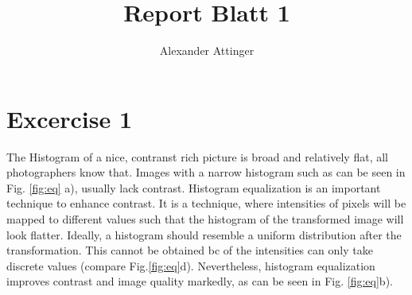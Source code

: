 \documentclass[11pt,a4paper]{article}
\author{Alexander Attinger}
\title{Report Blatt 1}
\begin{document}
\maketitle
\section{Excercise 1}
The Histogram of a nice, contranst rich picture is broad and relatively flat, all photographers know that. Images with a narrow histogram such as can be seen in Fig. \ref{fig:eq} a), usually lack contrast. Histogram equalization is an important technique to enhance contrast. It is a technique, where intensities of pixels will be mapped to different values such that the histogram of the transformed image will look flatter. Ideally, a histogram should resemble a uniform distribution after the transformation. This cannot be obtained bc of the intensities can only take discrete values (compare Fig.\ref{fig:eq}d). Nevertheless, histogram equalization improves contrast and image quality markedly, as can be seen in Fig. \ref{fig:eq}b).
\end{document}
